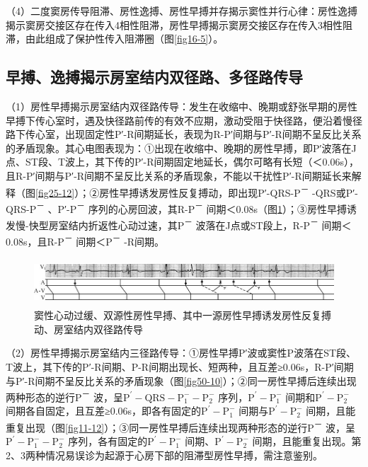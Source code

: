 （4）二度窦房传导阻滞、房性逸搏、房性早搏并存揭示窦性并行心律：房性逸搏揭示窦房交接区存在传入4相性阻滞，房性早搏揭示窦房交接区存在传入3相性阻滞，由此组成了保护性传入阻滞圈（图\ref{fig16-5}）。

\protect\hypertarget{text00043.htmlux5cux23subid468}{}{}

\subsection{早搏、逸搏揭示房室结内双径路、多径路传导}

（1）房性早搏揭示房室结内双径路传导：发生在收缩中、晚期或舒张早期的房性早搏下传心室时，遇及快径路前传的有效不应期，激动受阻于快径路，便沿着慢径路下传心室，出现固定性P′-R间期延长，表现为R-P′间期与P′-R间期不呈反比关系的矛盾现象。其心电图表现为：①出现在收缩中、晚期的房性早搏，即P′波落在J点、ST段、T波上，其下传的P′-R间期固定地延长，偶尔可略有长短（＜0.06s），且R-P′间期与P′-R间期不呈反比关系的矛盾现象，不能以干扰性P′-R间期延长来解释（图\ref{fig25-12}）；②房性早搏诱发房性反复搏动，即出现P′-QRS-P\textsuperscript{－}
-QRS或P′-QRS-P\textsuperscript{－} 、P′-P\textsuperscript{－}
序列的心房回波，其R-P\textsuperscript{－}
间期＜0.08s（图\ref{fig36-5}）；③房性早搏诱发慢-快型房室结内折返性心动过速，其P\textsuperscript{－}
波落在J点或ST段上，R-P\textsuperscript{－}
间期＜0.08s，且R-P\textsuperscript{－} 间期＜P\textsuperscript{－}
-R间期。

\begin{figure}[!htbp]
 \centering
 \includegraphics[width=5.78125in,height=0.6875in]{./images/Image00577.jpg}
 \captionsetup{justification=centering}
 \caption{窦性心动过缓、双源性房性早搏、其中一源房性早搏诱发房性反复搏动、房室结内双径路传导}
 \label{fig36-5}
  \end{figure} 

（2）房性早搏揭示房室结内三径路传导：①房性早搏P′波或窦性P波落在ST段、T波上，其下传的P′-R间期、P-R间期出现长、短两种，且互差≥0.06s，R-P′间期与P′-R间期不呈反比关系的矛盾现象（图\ref{fig50-10}）；②同一房性早搏后连续出现两种形态的逆行P\textsuperscript{－}
波，呈$\text{P}^\prime-\text{QRS}-\text{P}_1^--\text{P}_2^-$
序列，$\text{P}^\prime-\text{P}_1^-$
间期和$\text{P}^\prime-\text{P}_2^-$
间期各自固定，且互差≥0.06s，即各有固定的$\text{P}^\prime-\text{P}_1^-$
间期与$\text{P}^\prime-\text{P}_2^-$
间期，且能重复出现（图\ref{fig11-12}）；③同一房性早搏后连续出现两种形态的逆行P\textsuperscript{－}
波，呈$\text{P}^\prime-\text{P}_1^--\text{P}_2^-$
序列，各有固定的$\text{P}^\prime-\text{P}_1^-$
间期、$\text{P}^\prime-\text{P}_2^-$
间期，且能重复出现。第2、3两种情况易误诊为起源于心房下部的阻滞型房性早搏，需注意鉴别。


